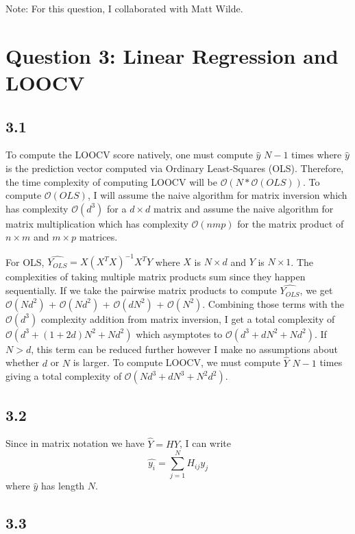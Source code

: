 \documentclass[12pt]{amsart}
\begin{document}
Note: For this question, I collaborated with Matt Wilde.


\section*{Question 3: Linear Regression and LOOCV}

\subsection*{3.1}

To compute the LOOCV score natively, one must compute $\hat{y}$ $N-1$ times where $\hat{y}$ is the prediction vector computed via Ordinary Least-Squares (OLS).  Therefore, the time complexity of computing LOOCV will be $\mathcal{O}(N * \mathcal{O}(OLS))$.  To compute $\mathcal{O}(OLS)$, I will assume the naive algorithm for matrix inversion which has complexity $\mathcal{O}(d^3)$ for a $d \times d$ matrix and assume the naive algorithm for matrix multiplication which has complexity $\mathcal{O}(nmp)$ for the matrix product of $n \times m$ and $m \times p$ matrices.

For OLS, $\hat{Y_{OLS}} = X(X^T X)^{-1}X^T Y$ where $X$ is $N \times d$ and $Y$ is $N \times 1$.  The complexities of taking multiple matrix products sum since they happen sequentially.  If we take the pairwise matrix products to compute $\hat{Y_{OLS}}$, we get $\mathcal{O}(Nd^2)$ + $\mathcal{O}(Nd^2)$ + $\mathcal{O}(dN^2)$ + $\mathcal{O}(N^2)$.  Combining those terms with the $\mathcal{O}(d^3)$ complexity addition from matrix inversion, I get a total complexity of $\mathcal{O}(d^3 + (1+2d)N^2 + Nd^2)$ which asymptotes to $\mathcal{O}(d^3 + dN^2 + Nd^2)$.  If $N > d$, this term can be reduced further however I make no assumptions about whether $d$ or $N$ is larger.  To compute LOOCV, we must compute $\hat{Y}$ $N - 1$ times giving a total complexity of $\mathcal{O}(Nd^3 + dN^3 + N^2d^2)$.

\subsection*{3.2}

Since in matrix notation we have $\hat{Y} = HY$, I can write 
\begin{equation}
\hat{y_i} = \sum_{j=1}^N H_{ij}y_j
\end{equation}
where $\hat{y}$ has length $N$.

\subsection*{3.3}
\end{document}

